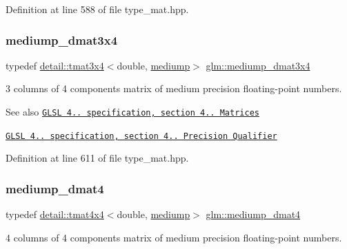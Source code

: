 Definition at line 588 of file type\+\_\+mat.\+hpp.

\mbox{\label{group__core__precision_gaedd814e706701200b13b86fc6fd7b373}} 
\subsubsection{\texorpdfstring{mediump\+\_\+dmat3x4}{mediump\_dmat3x4}}
{\footnotesize\ttfamily typedef \hyperlink{structglm_1_1detail_1_1tmat3x4}{detail\+::tmat3x4}$<$double, \hyperlink{namespaceglm_a0f04f086094c747d227af4425893f545a6416f3ea0c9025fb21ed50c4d6620482}{mediump}$>$ \hyperlink{group__core__precision_gaedd814e706701200b13b86fc6fd7b373}{glm\+::mediump\+\_\+dmat3x4}}

3 columns of 4 components matrix of medium precision floating-\/point numbers.

\begin{DoxySeeAlso}{See also}
\href{http://www.opengl.org/registry/doc/GLSLangSpec.4.20.8.pdf}{\tt G\+L\+SL 4.. specification, section 4.. Matrices} 

\href{http://www.opengl.org/registry/doc/GLSLangSpec.4.20.8.pdf}{\tt G\+L\+SL 4.. specification, section 4.. Precision Qualifier} 
\end{DoxySeeAlso}


Definition at line 611 of file type\+\_\+mat.\+hpp.

\mbox{\label{group__core__precision_ga73de517f040f7d50746bbe273a396685}} 
\subsubsection{\texorpdfstring{mediump\+\_\+dmat4}{mediump\_dmat4}}
{\footnotesize\ttfamily typedef \hyperlink{structglm_1_1detail_1_1tmat4x4}{detail\+::tmat4x4}$<$double, \hyperlink{namespaceglm_a0f04f086094c747d227af4425893f545a6416f3ea0c9025fb21ed50c4d6620482}{mediump}$>$ \hyperlink{group__core__precision_ga73de517f040f7d50746bbe273a396685}{glm\+::mediump\+\_\+dmat4}}

4 columns of 4 components matrix of medium precision floating-\/point numbers.

